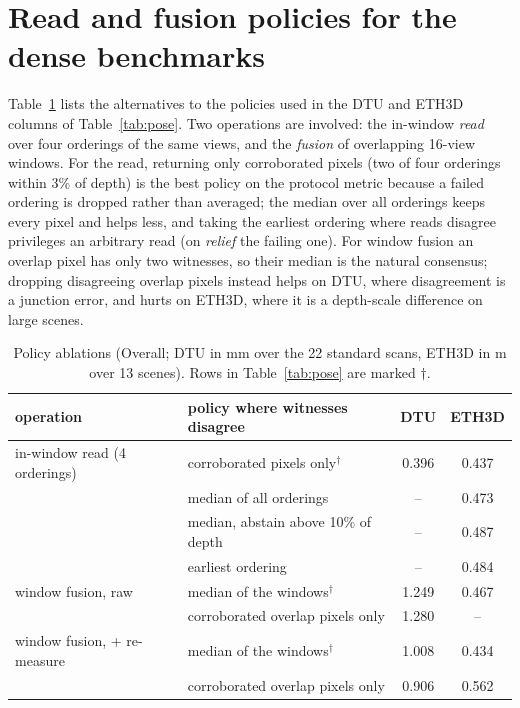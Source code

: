 \section{Read and fusion policies for the dense benchmarks}
\label{app:policies}

Table~\ref{tab:policies} lists the alternatives to the policies used in
the DTU and ETH3D columns of Table~\ref{tab:pose}. Two operations are involved: the
in-window \emph{read} over four orderings of the same views, and the
\emph{fusion} of overlapping 16-view windows. For the read, returning only
corroborated pixels (two of four orderings within 3\% of depth) is the best
policy on the protocol metric because a failed ordering is dropped rather
than averaged; the median over all orderings keeps every pixel and helps
less, and taking the earliest ordering where reads disagree privileges an
arbitrary read (on \emph{relief} the failing one). For window fusion an
overlap pixel has only two witnesses, so their median is the natural
consensus; dropping disagreeing overlap pixels instead helps on DTU, where
disagreement is a junction error, and hurts on ETH3D, where it is a
depth-scale difference on large scenes.

\begin{table}[h]
\centering\scriptsize
\setlength{\tabcolsep}{5pt}
\caption{Policy ablations (Overall; DTU in mm over the 22 standard scans,
ETH3D in m over 13 scenes). Rows in Table~\ref{tab:pose} are marked $\dagger$.}
\label{tab:policies}
\begin{tabular}{@{}l l c c@{}}
\toprule
operation & policy where witnesses disagree & DTU & ETH3D \\
\midrule
in-window read (4 orderings) & corroborated pixels only$^{\dagger}$ & 0.396 & 0.437 \\
 & median of all orderings & -- & 0.473 \\
 & median, abstain above 10\% of depth & -- & 0.487 \\
 & earliest ordering & -- & 0.484 \\
\midrule
window fusion, raw & median of the windows$^{\dagger}$ & 1.249 & 0.467 \\
 & corroborated overlap pixels only & 1.280 & -- \\
window fusion, + re-measure & median of the windows$^{\dagger}$ & 1.008 & 0.434 \\
 & corroborated overlap pixels only & 0.906 & 0.562 \\
\bottomrule
\end{tabular}
\end{table}
